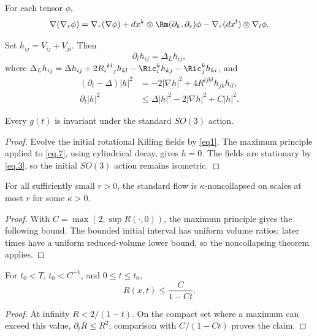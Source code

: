 \begin{claim}
\label{claim:commuting-covariant-derivatives}
For each tensor $\phi$,
\[\nabla(\nabla_r\phi)=\nabla_r(\nabla\phi)+dx^k\otimes
\Rm(\partial_k,\partial_r)\phi-\nabla_r(dx^l)\otimes\nabla_l\phi.\]
\end{claim}

Set $h_{ij}=V_{ij}+V_{ji}$. Then
\begin{equation}\label{eq.5}\partial_th_{ij}=\Delta_Lh_{ij},\end{equation}
where $\Delta_Lh_{ij}=\Delta h_{ij}+2{{R_i}^{kl}}_jh_{kl}-\Ric_i^kh_{kj}-\Ric_j^kh_{ki}$, and
\begin{align}
 (\partial_t-\Delta)|h|^2&=-2|\nabla h|^2+4R^{ijkl}h_{jk}h_{il},\label{eq.6}\\
 \partial_t|h|^2&\le\Delta|h|^2-2|\nabla h|^2+C|h|^2.\label{eq.7}
\end{align}

\begin{corollary}
\label{cor:standard-solution-rotationally-symmetric}
Every $g(t)$ is invariant under the standard $SO(3)$ action.
\end{corollary}
\begin{proof}
\sketch Evolve the initial rotational Killing fields by \eqref{eq1}.
The maximum principle applied to \eqref{eq.7}, using cylindrical decay,
gives $h=0$. The fields are stationary by \eqref{eq.3}, so the initial
$SO(3)$ action remains isometric.
\end{proof}

\begin{proposition}
\label{prop:standard-flow-kappa-noncollapsed}
\label{stdkappa}
For all sufficiently small $r>0$, the standard flow is
$\kappa$-noncollapsed on scales at most $r$ for some $\kappa>0$.
\end{proposition}
\begin{proof}
\sketch With $C=\max(2,\sup R(\cdot,0))$, the maximum principle gives
the following bound. The bounded initial interval has uniform volume ratios;
later times have a uniform reduced-volume lower bound, so the noncollapsing
theorem applies.
\end{proof}
\begin{claim}
\label{claim:standard-flow-curvature-bound}
For $t_0<T$, $t_0<C^{-1}$, and $0\le t\le t_0$,
\[R(x,t)\le\frac C{1-Ct}.\]
\end{claim}
\begin{proof}
\sketch At infinity $R<2/(1-t)$. On the compact set where a maximum can
exceed this value, $\partial_tR\le R^2$; comparison with $C/(1-Ct)$ proves
the claim.
\end{proof}

